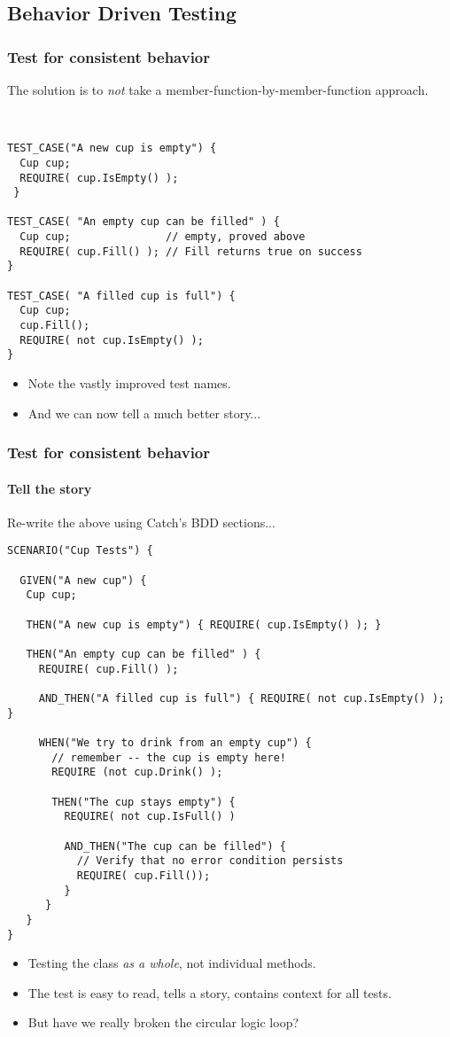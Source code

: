 \subsection{Behavior Driven Testing}
\begin{frame}[fragile,t]
\frametitle{Test for consistent behavior}
The solution is to \emph{not} take a
member-function-by-member-function approach.  
{\scriptsize\
\begin{verbatim}
TEST_CASE("A new cup is empty") {
  Cup cup;
  REQUIRE( cup.IsEmpty() ); 
 }                                     

TEST_CASE( "An empty cup can be filled" ) {
  Cup cup;               // empty, proved above
  REQUIRE( cup.Fill() ); // Fill returns true on success
}

TEST_CASE( "A filled cup is full") {
  Cup cup;
  cup.Fill();
  REQUIRE( not cup.IsEmpty() );
}  
\end{verbatim}}

\begin{itemize}
\item Note the vastly improved test names.
\item And we can now tell a much better story...
\end{itemize}
\end{frame}

\begin{frame}[fragile,t]
\frametitle{Test for consistent behavior}
\framesubtitle{Tell the story}
Re-write the above using Catch's BDD sections...
{\tiny \begin{verbatim}
SCENARIO("Cup Tests") {

  GIVEN("A new cup") {
   Cup cup;

   THEN("A new cup is empty") { REQUIRE( cup.IsEmpty() ); }

   THEN("An empty cup can be filled" ) {
     REQUIRE( cup.Fill() );

     AND_THEN("A filled cup is full") { REQUIRE( not cup.IsEmpty() ); }

     WHEN("We try to drink from an empty cup") {
       // remember -- the cup is empty here!
       REQUIRE (not cup.Drink() );

       THEN("The cup stays empty") {
         REQUIRE( not cup.IsFull() )

         AND_THEN("The cup can be filled") {
           // Verify that no error condition persists
           REQUIRE( cup.Fill());
         }
      }
   }
}  
\end{verbatim}
}
\begin{itemize}
\item Testing the class \emph{as a whole}, not individual methods.
\item The test is easy to read, tells a story, contains context for
  all tests.
\item But have we really broken the circular logic loop?
\end{itemize}
\end{frame}

